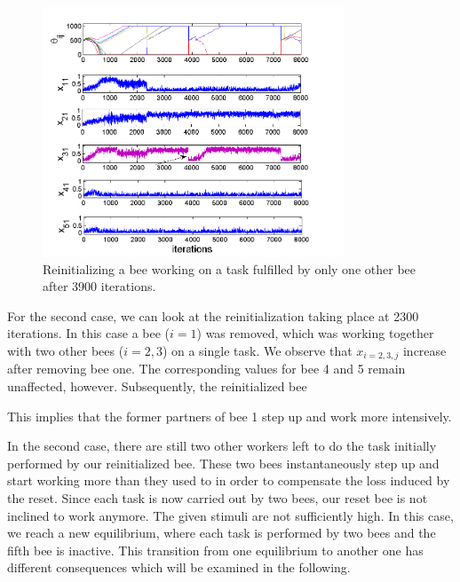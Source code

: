 \begin{figure}[ht!]
	\centering
	\includegraphics[width=0.8\textwidth]{figures/figure1.png}
	\caption{Reinitializing a bee working on a task fulfilled by only one other bee after 3900 iterations.}
	\label{fig:figure1}
\end{figure}

For the second case, we can look at the reinitialization taking place at 2300 iterations. In this case a bee ($i=1$) was removed, which was working together with two other bees ($i=2,3$) on a single task. We observe that $x_{i=2,3,j}$ increase after removing bee one. The corresponding values for bee 4 and 5 remain unaffected, however. Subsequently, the reinitialized bee

This implies that the former partners of bee 1 step up and work more intensively.

In the second case, there are still two other workers left to do the task initially performed by our reinitialized bee. These two bees instantaneously step up and start working more than they used to in order to compensate the loss induced by the reset. Since each task is now carried out by two bees, our reset bee is not inclined to work anymore. The given stimuli are not sufficiently high. In this case, we reach a new equilibrium, where each task is performed by two bees and the fifth bee is inactive. This transition from one equilibrium to another one has different consequences which will be examined in the following.


